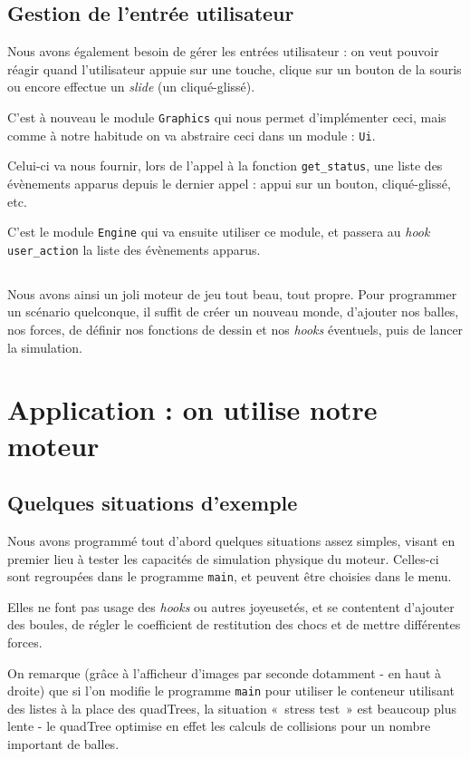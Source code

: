 \documentclass[a4paper]{scrartcl}
\begin{document}
\subsection{Gestion de l'entrée utilisateur}
Nous avons également besoin de gérer les entrées utilisateur : on veut
pouvoir réagir quand l'utilisateur appuie sur une touche, clique sur
un bouton de la souris ou encore effectue un \emph{slide} (un
cliqué-glissé).

C'est à nouveau le module \texttt{Graphics} qui nous permet
d'implémenter ceci, mais comme à notre habitude on va abstraire ceci
dans un module : \texttt{Ui}.

Celui-ci va nous fournir, lors de l'appel à la fonction
\texttt{get\_status}, une liste des évènements apparus depuis le
dernier appel : appui sur un bouton, cliqué-glissé, etc.

C'est le module \texttt{Engine} qui va ensuite utiliser ce module, et
passera au \emph{hook} \texttt{user\_action} la liste des évènements
apparus.

\subsection*{}
Nous avons ainsi un joli moteur de jeu tout beau, tout propre. Pour
programmer un scénario quelconque, il suffit de créer un nouveau
monde, d'ajouter nos balles, nos forces, de définir nos fonctions de
dessin et nos \emph{hooks} éventuels, puis de lancer la simulation.


\section{Application : on utilise notre moteur}
\label{applications}

\subsection{Quelques situations d'exemple}

Nous avons programmé tout d'abord quelques situations assez simples,
visant en premier lieu à tester les capacités de simulation physique
du moteur. Celles-ci sont regroupées dans le programme \texttt{main},
et peuvent être choisies dans le menu.

Elles ne font pas usage des \emph{hooks} ou autres joyeusetés, et se
contentent d'ajouter des boules, de régler le coefficient de
restitution des chocs et de mettre différentes forces.

On remarque (grâce à l'afficheur d'images par seconde dotamment - en
haut à droite) que si l'on modifie le programme \texttt{main} pour
utiliser le conteneur utilisant des listes à la place des quadTrees,
la situation «~stress test~» est beaucoup plus lente - le quadTree
optimise en effet les calculs de collisions pour un nombre important
de balles.
\end{document}
